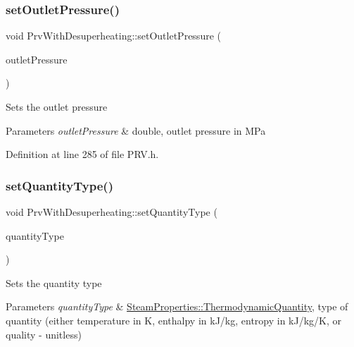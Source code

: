\subsubsection{\texorpdfstring{set\+Outlet\+Pressure()}{setOutletPressure()}}
{\footnotesize\ttfamily void Prv\+With\+Desuperheating\+::set\+Outlet\+Pressure (\begin{DoxyParamCaption}\item[{double}]{outlet\+Pressure }\end{DoxyParamCaption})\hspace{0.3cm}{\ttfamily [inline]}}

Sets the outlet pressure


\begin{DoxyParams}{Parameters}
{\em outlet\+Pressure} & double, outlet pressure in M\+Pa \\
\hline
\end{DoxyParams}


Definition at line 285 of file P\+R\+V.\+h.

\mbox{\label{class_prv_with_desuperheating_aed049483cd58d41501ce1461ad251230}} 
\subsubsection{\texorpdfstring{set\+Quantity\+Type()}{setQuantityType()}}
{\footnotesize\ttfamily void Prv\+With\+Desuperheating\+::set\+Quantity\+Type (\begin{DoxyParamCaption}\item[{\hyperlink{class_steam_properties_ae0294bedf7d178c2d8fb6aed0f62fbff}{Steam\+Properties\+::\+Thermodynamic\+Quantity}}]{quantity\+Type }\end{DoxyParamCaption})\hspace{0.3cm}{\ttfamily [inline]}}

Sets the quantity type


\begin{DoxyParams}{Parameters}
{\em quantity\+Type} & \hyperlink{class_steam_properties_ae0294bedf7d178c2d8fb6aed0f62fbff}{Steam\+Properties\+::\+Thermodynamic\+Quantity}, type of quantity (either temperature in K, enthalpy in k\+J/kg, entropy in k\+J/kg/K, or quality -\/ unitless) \\
\hline
\end{DoxyParams}


